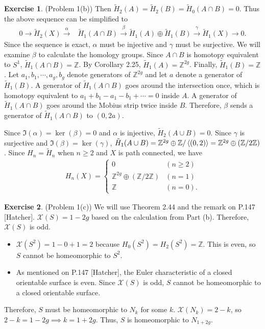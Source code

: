 \documentclass[12pt, psamsfonts]{amsart}
\theoremstyle{definition}
\newtheorem*{exer}{Exercise}
\theoremstyle{remark}
\numberwithin{equation}{section}
\begin{document}
\begin{exer}{(Problem 1(b))}
  Then $\tilde{H}_2(A) = \tilde{H}_2(B) = \tilde{H}_0(A \cap B) = 0$.
  Thus the above sequence can be simplified to 
  \begin{align*}
    0 \rightarrow \tilde{H}_2(X) \xrightarrow{\alpha} &\tilde{H}_1(A \cap B) \xrightarrow{\beta} \tilde{H}_1(A) \oplus \tilde{H}_1(B) \xrightarrow{\gamma} \tilde{H}_1(X) \rightarrow 0.
  \end{align*}
  Since the sequence is exact, $\alpha$ must be injective and $\gamma$ must be surjective.
  We will examine $\beta$ to calculate the homology groups.
  Since $A \cap B$ is homotopy equivalent to $S^1$, $\tilde{H}_1(A \cap B) = \mathbb{Z}$.
  By Corollary 2.25, $\tilde{H}_1(A) = \mathbb{Z}^{2g}$.
  Finally, $\tilde{H}_1(B) = \mathbb{Z}$.
  Let $a_1, b_1, \cdots, a_g, b_g$ denote generators of $\mathbb{Z}^{2g}$ and let $a$ denote a generator of $\tilde{H}_1(B)$.
  A generator of $\tilde{H}_1(A \cap B)$ goes around the intersection once, which is homotopy equivalent to $a_1 + b_1 - a_1 - b_1 + \cdots = 0$ inside $A$.
  A generator of $\tilde{H}_1(A \cap B)$ goes around the Mobius strip twice inside $B$.
  Therefore, $\beta$ sends a generator of $\tilde{H}_1(A \cap B)$ to $(0, 2a)$.

  Since $\Im(\alpha) = \ker(\beta) = 0$ and $\alpha$ is injective, $\tilde{H}_2(A \cup B) = 0$.
  Since $\gamma$ is surjective and $\Im(\beta) = \ker(\gamma)$, $\tilde{H}_1(A \cup B) = \mathbb{Z}^{2g} \oplus \mathbb{Z} / \ev{(0, 2)} = \mathbb{Z}^{2g} \oplus (\mathbb{Z} / 2\mathbb{Z})$.
  Since $H_n = \tilde{H}_n$ when $n \geq 2$ and $X$ is path connected, we have
  \begin{align*}
    H_n(X) = \begin{cases}
      0 & (n \geq 2) \\
      \mathbb{Z}^{2g} \oplus (\mathbb{Z} / 2\mathbb{Z}) & (n = 1) \\
      \mathbb{Z} & (n = 0).
    \end{cases}
  \end{align*}
\end{exer}

\begin{exer}{(Problem 1(c))}
  We will use Theorem 2.44 and the remark on P.147 [Hatcher].
  $\mathcal{X}(S) = 1 - 2g$ based on the calculation from Part (b).
  Therefore, $\mathcal{X}(S)$ is odd.
  \begin{itemize}
    \item
      $\mathcal{X}(S^2) = 1 - 0 + 1 = 2$ because $H_0(S^2) = H_2(S^2) = \mathbb{Z}$.
      This is even, so $S$ cannot be homeomorphic to $S^2$.
    \item
      As mentioned on P.147 [Hatcher], the Euler characteristic of a closed orientable surface is even.
      Since $\mathcal{X}(S)$ is odd, $S$ cannot be homeomorphic to a closed orientable surface.
  \end{itemize}
  Therefore, $S$ must be homeomorphic to $N_k$ for some $k$.
  $\mathcal{X}(N_k) = 2 - k$, so $2 - k = 1 - 2g \implies k = 1 + 2g$.
  Thus, $S$ is homeomorphic to $N_{1 + 2g}$.
\end{exer}
\end{document}

